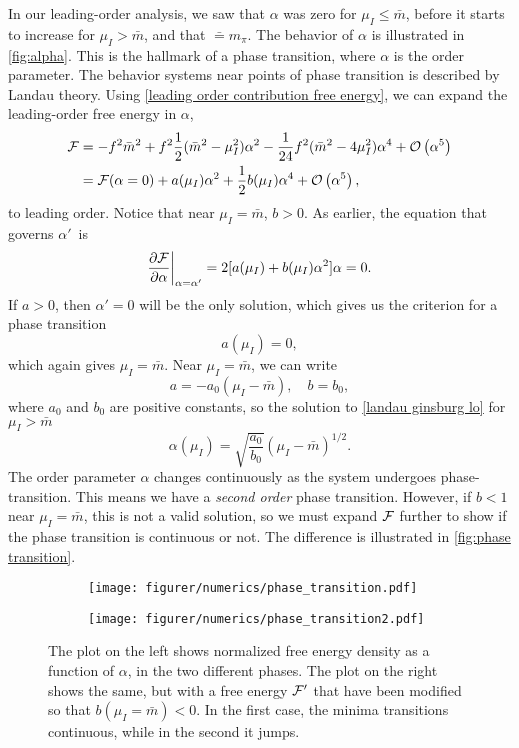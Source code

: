 In our leading-order analysis, we saw that $\alpha$ was zero for $\mu_I \leq \bar m$, before it starts to increase for $\mu_I>\bar m$, and that $\bar = m_\pi$.
The behavior of $\alpha$ is illustrated in \autoref{fig:alpha}.
This is the hallmark of a phase transition, where $\alpha$ is the order parameter.
The behavior systems near points of phase transition is described by Landau theory.
Using \cref{leading order contribution free energy}, we can expand the leading-order free energy in $\alpha$,
\begin{align}
    \Ef
    & = -f^2 \bar m^2 + f^2 \frac{1}{2}(\bar m^2 - \mu_I^2)\alpha^2
    - \frac{1}{24} f^2 (\bar m^2 - 4 \mu_I^2) \alpha^4 + \Oh[5]{\alpha} \\
    & = \Ef(\alpha=0) + a(\mu_I)\alpha^2 + \frac{1}{2} b(\mu_I)\alpha^4 + \Oh[5]{\alpha},
\end{align}
to leading order.
Notice that near $\mu_I = \bar m$, $b > 0$.
As earlier, the equation that governs $\alpha'$ is
\begin{equation}
    \label{landau ginsburg lo}
    \diffp{\Ef}{\alpha} \bigg|_{\alpha=\alpha'} = 2 [a(\mu_I) + b(\mu_I) \alpha^2] \alpha = 0.
\end{equation}
If $a>0$, then $\alpha' = 0$ will be the only solution, which gives us the criterion for a phase transition 
\begin{equation}
    a(\mu_I) = 0,
\end{equation}
which again gives $\mu_I = \bar m$.
Near $\mu_I = \bar m$, we can write
\begin{equation}
    a = - a_0 (\mu_I - \bar m), \quad b = b_0,
\end{equation}
where $a_0$ and $b_0$ are positive constants, so the solution to \cref{landau ginsburg lo} for $\mu_I>\bar m$
\begin{equation}
    \alpha(\mu_I) = \sqrt{\frac{a_0}{b_0}} (\mu_I - \bar m)^{1/2}.
\end{equation}
The order parameter $\alpha$ changes continuously as the system undergoes phase-transition.
This means we have a \emph{second order} phase transition.
However, if $b < 1$ near $\mu_I = \bar m$, this is not a valid solution, so we must expand $\Ef$ further to show if the phase transition is continuous or not.
The difference is illustrated in \autoref{fig:phase transition}.
\begin{figure}
    \centering
    \begin{subfigure}{0.49\textwidth}
        \texttt{[image: figurer/numerics/phase\_transition.pdf]}
    \end{subfigure}
    \begin{subfigure}{0.49\textwidth}
        \texttt{[image: figurer/numerics/phase\_transition2.pdf]}
    \end{subfigure}
    \caption{The plot on the left shows normalized free energy density as a function of $\alpha$, in the two different phases. The plot on the right shows the same, but with a free energy $\Ef'$ that have been modified so that $b(\mu_I=\bar m)<0$.
    In the first case, the minima transitions continuous, while in the second it jumps.}
    \label{fig:phase transition}
\end{figure}

